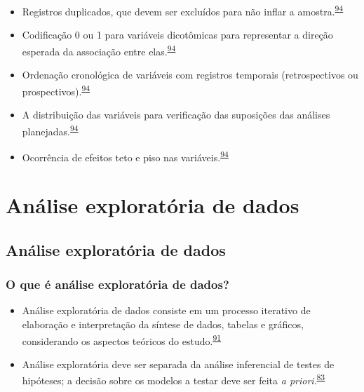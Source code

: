 \documentclass[
  a4paper,
]{book}
\begin{document}
\begin{itemize}
\item
  Registros duplicados, que devem ser excluídos para não inflar a amostra.\textsuperscript{\protect\hyperlink{ref-huebner2016}{94}}
\item
  Codificação 0 ou 1 para variáveis dicotômicas para representar a direção esperada da associação entre elas.\textsuperscript{\protect\hyperlink{ref-huebner2016}{94}}
\item
  Ordenação cronológica de variáveis com registros temporais (retrospectivos ou prospectivos).\textsuperscript{\protect\hyperlink{ref-huebner2016}{94}}
\item
  A distribuição das variáveis para verificação das suposições das análises planejadas.\textsuperscript{\protect\hyperlink{ref-huebner2016}{94}}
\item
  Ocorrência de efeitos teto e piso nas variáveis.\textsuperscript{\protect\hyperlink{ref-huebner2016}{94}}
\end{itemize}

\hypertarget{analise-exploratoria-dados}{%
\chapter{\texorpdfstring{\textbf{Análise exploratória de dados}}{Análise exploratória de dados}}\label{analise-exploratoria-dados}}

\hypertarget{analise-exploratoria}{%
\section{Análise exploratória de dados}\label{analise-exploratoria}}

\hypertarget{o-que-uxe9-anuxe1lise-exploratuxf3ria-de-dados}{%
\subsection{O que é análise exploratória de dados?}\label{o-que-uxe9-anuxe1lise-exploratuxf3ria-de-dados}}

\begin{itemize}
\item
  Análise exploratória de dados consiste em um processo iterativo de elaboração e interpretação da síntese de dados, tabelas e gráficos, considerando os aspectos teóricos do estudo.\textsuperscript{\protect\hyperlink{ref-Ferketich1986}{91}}
\item
  Análise exploratória deve ser separada da análise inferencial de testes de hipóteses; a decisão sobre os modelos a testar deve ser feita \emph{a priori}.\textsuperscript{\protect\hyperlink{ref-zuur2009}{83}}
\end{itemize}
\end{document}
